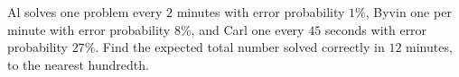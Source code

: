 Al solves one problem every $2$ minutes with error probability $1\%$, Byvin one per minute with error probability $8\%$, and Carl one every $45$ seconds with error probability $27\%$. Find the expected total number solved correctly in $12$ minutes, to the nearest hundredth.
